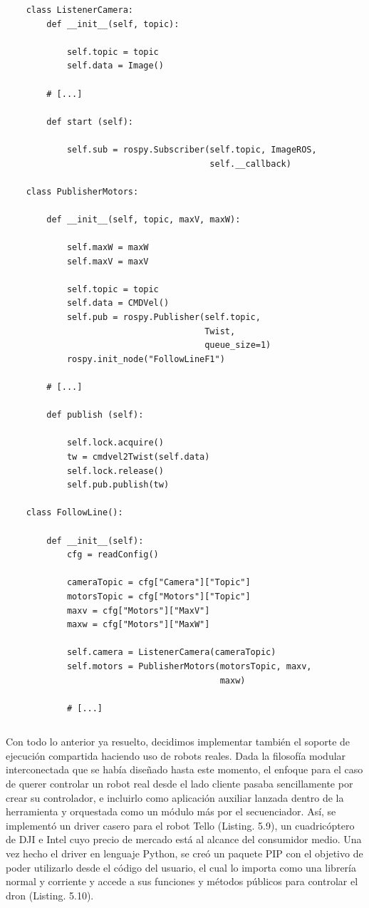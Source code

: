 \begin{verbatim}
    class ListenerCamera:
        def __init__(self, topic):
            
            self.topic = topic
            self.data = Image()
    
        # [...]
    
        def start (self):
     
            self.sub = rospy.Subscriber(self.topic, ImageROS,
                                        self.__callback)
    
    class PublisherMotors:
     
        def __init__(self, topic, maxV, maxW):
    
            self.maxW = maxW
            self.maxV = maxV
    
            self.topic = topic
            self.data = CMDVel()
            self.pub = rospy.Publisher(self.topic,
                                       Twist,
                                       queue_size=1)
            rospy.init_node("FollowLineF1")
    
        # [...]
    
        def publish (self):
    
            self.lock.acquire()
            tw = cmdvel2Twist(self.data)
            self.lock.release()
            self.pub.publish(tw)
    
    class FollowLine():
        
        def __init__(self):
            cfg = readConfig()
    
            cameraTopic = cfg["Camera"]["Topic"]
            motorsTopic = cfg["Motors"]["Topic"]
            maxv = cfg["Motors"]["MaxV"]
            maxw = cfg["Motors"]["MaxW"]
    
            self.camera = ListenerCamera(cameraTopic)
            self.motors = PublisherMotors(motorsTopic, maxv,
                                          maxw)
    
            # [...]
\end{verbatim}
\begin{lstlisting}[caption=Creación de la Red Interna de Comunicación]
\end{lstlisting}

Con todo lo anterior ya resuelto, decidimos implementar también el soporte de ejecución compartida haciendo uso de robots reales. Dada la filosofía modular interconectada que se había diseñado hasta este momento, el enfoque para el caso de querer controlar un robot real desde el lado cliente pasaba sencillamente por crear su controlador, e incluirlo como aplicación auxiliar lanzada dentro de la herramienta y orquestada como un módulo más por el secuenciador. Así, se implementó un driver casero para el robot Tello (Listing. 5.9), un cuadricóptero de DJI e Intel cuyo precio de mercado está al alcance del consumidor medio. Una vez hecho el driver en lenguaje Python, se creó un paquete PIP con el objetivo de poder utilizarlo desde el código del usuario, el cual lo importa como una librería normal y corriente y accede a sus funciones y métodos públicos para controlar el dron (Listing. 5.10). 


